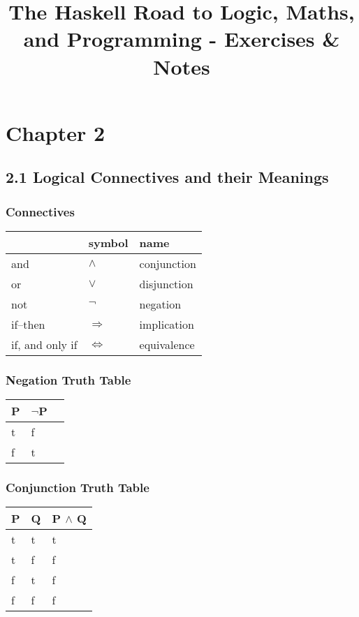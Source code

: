 \documentclass[11pt]{article}
\title{\textbf{The Haskell Road to Logic, Maths, and Programming - Exercises \& Notes}}
\author{}
\date{}
\begin{document}
\maketitle
\thispagestyle{empty}

\section*{Chapter 2}
\subsection*{2.1 Logical Connectives and their Meanings}
\subsubsection*{Connectives}

\begin{tabular}{|l|l|l|} \hline
     {} & \textbf{symbol} & \textbf{name}\\ \hline
	and & $\land$ & conjunction\\ \hline
	or & $\lor$ & disjunction\\ \hline
	not & $\neg$ & negation\\ \hline
	if--then & $\Rightarrow$ & implication\\ \hline
	if, and only if & $\iff$ & equivalence\\ \hline
\end{tabular}
\subsubsection*{Negation Truth Table}
\begin{tabular}{|l|l|l|}
\hline
	\textbf{P} & $\neg$\textbf{P}\\
\hline
	t & f\\
\hline
    f & t\\
\hline
\end{tabular}
\subsubsection*{Conjunction Truth Table}
\begin{tabular}{|l|l|l|}
\hline
	\textbf{P} & \textbf{Q} & \textbf{P} $\land$ \textbf{Q}\\
\hline
	t & t & t\\
\hline
	t & f & f\\
\hline
	f & t & f\\
\hline
	f & f & f\\
\hline
\end{tabular}
\end{document}
